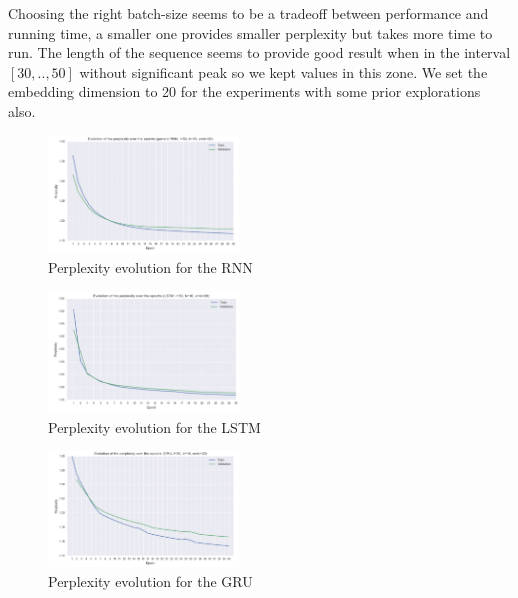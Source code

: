 \documentclass[11pt]{article}
\begin{document}
Choosing the right batch-size seems to be a tradeoff between performance and running time, a smaller one provides smaller perplexity but takes more time to run. The length of the sequence seems to provide good result when in the interval $[30,..,50]$ without significant peak so we kept values in this zone. We set the embedding dimension to 20 for the experiments with some prior explorations also.


\begin{figure}[H]
\begin{center}
    \includegraphics[width=0.45\textwidth]{perp_rnn.png}
    \caption{Perplexity evolution for the RNN}
\end{center}
\end{figure}

\begin{figure}[H]
\begin{center}
    \includegraphics[width=0.45\textwidth]{perp_lstm.png}
    \caption{Perplexity evolution for the LSTM}
\end{center}
\end{figure}

\begin{figure}[H]
\begin{center}
    \includegraphics[width=0.45\textwidth]{perp_gru.png}
    \caption{Perplexity evolution for the GRU}
\end{center}
\end{figure}
\end{document}
